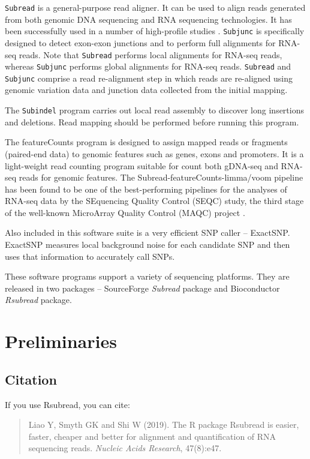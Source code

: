 \documentclass[12pt]{report}
\newcommand{\code}[1]{{\small\texttt{#1}}}
\newcommand{\Rsubread}{\textsf{Rsubread}}
\newcommand{\ExactSNP}{\textsf{ExactSNP}}
\newcommand{\featureCounts}{\textsf{featureCounts}}
\begin{document}
\code{Subread} is a general-purpose read aligner.
It can be used to align reads generated from both genomic DNA sequencing and RNA sequencing technologies.
It has been successfully used in a number of high-profile studies \cite{TangNC2013,ManNI2013,SpangenbergSCR2013,tang,ezh2}.
\code{Subjunc} is specifically designed to detect exon-exon junctions and to perform full alignments for RNA-seq reads.
Note that \code{Subread} performs local alignments for RNA-seq reads, whereas \code{Subjunc} performs global alignments for RNA-seq reads.
\code{Subread} and \code{Subjunc} comprise a read re-alignment step in which reads are re-aligned using genomic variation data and junction data collected from the initial mapping.

The \code{Subindel} program carries out local read assembly to discover long insertions and deletions.
Read mapping should be performed before running this program.

The {\featureCounts} program is designed to assign mapped reads or fragments (paired-end data) to genomic features such as genes, exons and promoters.
It is a light-weight read counting program suitable for count both gDNA-seq and RNA-seq reads for genomic features\cite{fcounts}.
The \textsf{Subread-featureCounts-limma/voom} pipeline has been found to be one of the best-performing pipelines for the analyses of RNA-seq data by the SEquencing Quality Control (SEQC) study, the third stage of the well-known MicroArray Quality Control (MAQC) project \cite{seqc}.

Also included in this software suite is a very efficient SNP caller -- {\ExactSNP}.
{\ExactSNP} measures local background noise for each candidate SNP and then uses that information to accurately call SNPs.

These software programs support a variety of sequencing platforms. 
They are released in two packages -- SourceForge \emph{Subread} package and Bioconductor \emph{Rsubread} package\cite{Rsubread}.

\chapter{Preliminaries}

\section{Citation}

If you use {\Rsubread}, you can cite:

\begin{quote}
Liao Y, Smyth GK and Shi W (2019). 
The R package Rsubread is easier, faster, cheaper and better for alignment and quantification of RNA sequencing reads. 
\emph{Nucleic Acids Research}, 47(8):e47.
\\
{ }
\end{quote}
\end{document}
